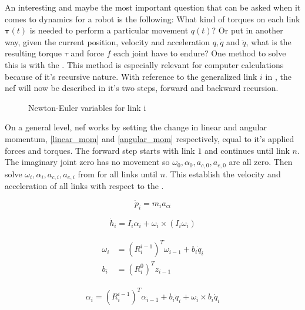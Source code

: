 An interesting and maybe the most important question that can be asked when it comes to dynamics for a robot is the following: What kind of torques on each link $\mathbf{\tau}(t)$ is needed to perform a particular movement $q(t)$? Or put in another way, given the current position, velocity and acceleration $q, \dot{q}$ and $\ddot{q}$, what is the resulting torque $\tau$ and force $f$ each joint have to endure? One method to solve this is with the . This method is especially relevant for computer calculations because of it's recursive nature. With reference to the generalized link $i$ in , the  \gls{nef} will now be described in it's two steps, forward and backward recursion.

\begin{figure}[h!]    
    \centering           
    \def\svgwidth{\columnwidth}
    
    \caption{Newton-Euler variables for link i}
    \label{newtonEuler}
\end{figure}

On a general level, \gls{nef} works by setting the change in linear and angular momentum, \eqref{linear_mom} and \eqref{angular_mom} respectively, equal to it's applied forces and torques. The forward step starts with link $1$ and continues until link $n$. The imaginary joint zero has no movement so $\omega_0, \alpha_0, a_{c,0}, a_{e,0}$ are all zero. Then solve $\omega_i, \alpha_i, a_{c,i}, a_{e,i}$ from  for all links until $n$. This establish the velocity and acceleration of all links with respect to the .

\begin{equation}\label{linear_mom}
\dot{p}_i = m_i a_{ci}
\end{equation}

\begin{equation}\label{angular_mom}
\dot{h}_i = I_i \alpha_i + \omega_i \times \left ( I_i \omega_i \right )
\end{equation}

\begin{align}\label{omega}
\begin{split}
\omega_i &= \left ( R^{i-1}_i \right )^T\omega_{i-1} + b_i\dot{q}_i\\
b_i &= \left ( R^0_i \right )^T z_{i-1}
\end{split}
\end{align}

\begin{equation}\label{alpha}
\alpha_i = \left ( R^{i-1}_i \right )^T\alpha_{i-1} + b_i\ddot{q}_i+\omega_i \times b_i\dot{q}_i
\end{equation}

